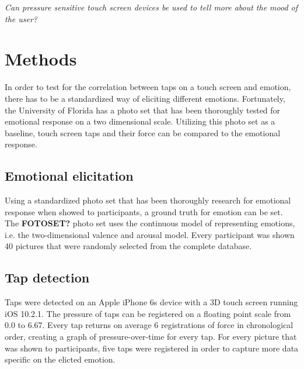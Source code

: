 \documentclass{sig-alternate}
\begin{document}
\textit{Can pressure sensitive touch screen devices be used to tell more about the mood of the user?}\\


\section{Methods} %
\label{sec:methods}
In order to test for the correlation between taps on a touch screen and emotion, there has to be a standardized way of eliciting different emotions. Fortunately, the University of Florida has a photo set that has been thoroughly tested for emotional response on a two dimensional scale. Utilizing this photo set as a baseline, touch screen taps and their force can be compared to the emotional response.

\subsection{Emotional elicitation} %
\label{sub:emotional_elicitation}
Using a standardized photo set that has been thoroughly research for emotional response when showed to participants, a ground truth for emotion can be set. The \textbf{FOTOSET?} photo set uses the continuous model of representing emotions, i.e. the two-dimensional valence and arousal model. Every participant was shown 40 pictures that were randomly selected from the complete database.

\subsection{Tap detection} %
\label{sub:tap_detection}
Taps were detected on an Apple iPhone 6s device with a 3D touch screen running iOS 10.2.1. The pressure of taps can be registered on a floating point scale from 0.0 to 6.67. Every tap returns on average 6 registrations of force in chronological order, creating a graph of pressure-over-time for every tap. For every picture that was shown to participants, five taps were registered in order to capture more data specific on the elicted emotion.
\end{document}

